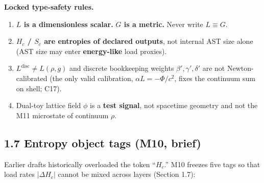 \documentclass[
  11pt,
]{article}
\providecommand{\tightlist}{%
  \setlength{\itemsep}{0pt}\setlength{\parskip}{0pt}}
\begin{document}
\textbf{Locked type-safety rules.}

\begin{enumerate}
\def\labelenumi{\arabic{enumi}.}
\tightlist
\item
  \textbf{\(L\) is a dimensionless scalar.} \textbf{\(G\) is a metric.}
  Never write \(L\equiv G\).\\
\item
  \textbf{\(H_c\) / \(S_c\) are entropies of declared outputs}, not
  internal AST size alone (AST size may enter \textbf{energy-like} load
  proxies).\\
\item
  \textbf{\(L^{\mathrm{disc}}\neq L(\rho,g)\)} and discrete bookkeeping
  weights \(\beta',\gamma',\delta'\) are not Newton-calibrated (the only valid calibration,
  \(\alpha L=-\Phi/c^2\), fixes the continuum sum on shell; C17).\\
\item
  Dual-toy lattice field \(\phi\) is a \textbf{test signal}, not
  spacetime geometry and not the M11 microstate of continuum \(\rho\).
\end{enumerate}

\subsection{1.7 Entropy object tags (M10,
brief)}\label{entropy-object-tags-m10-brief}

Earlier drafts historically overloaded the token ``\(H_c\).'' M10
freezes five tags so that load rates \(|\Delta H_c|\) cannot be mixed
across layers (Section 1.7):
\end{document}
